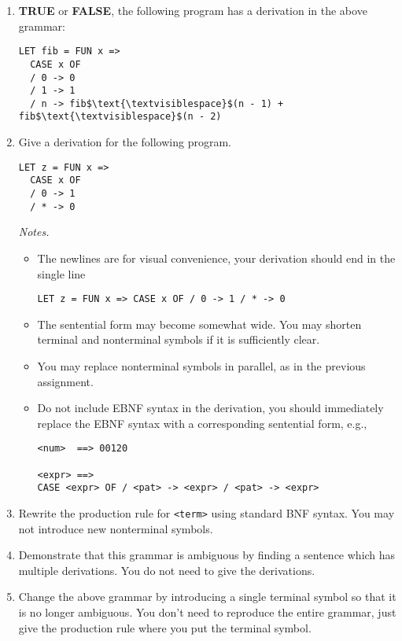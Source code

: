 \documentclass{article}
\theoremstyle{remark} \newtheorem*{solution}{Solution}
\begin{document}
\begin{enumerate}
\item
\textbf{TRUE} or \textbf{FALSE}, the following program has a
derivation in the above grammar:
\begin{lstlisting}[mathescape=true]
LET fib = FUN x =>
  CASE x OF
  / 0 -> 0
  / 1 -> 1
  / n -> fib$\text{\textvisiblespace}$(n - 1) + fib$\text{\textvisiblespace}$(n - 2)
\end{lstlisting}
\pagebreak
\item Give a derivation for the following program.
\begin{lstlisting}
LET z = FUN x =>
  CASE x OF
  / 0 -> 1
  / * -> 0
\end{lstlisting}
\textit{Notes.}
\begin{itemize}
\item
The newlines are for visual convenience, your derivation should end in
the single line
\begin{lstlisting}
LET z = FUN x => CASE x OF / 0 -> 1 / * -> 0
\end{lstlisting}
\item
The sentential form may become somewhat wide. You may shorten terminal
and nonterminal symbols if it is sufficiently clear.
\item
You may replace nonterminal symbols in parallel, as in the previous
assignment.
\item
Do not include EBNF syntax in the derivation, you should immediately
replace the EBNF syntax with a corresponding sentential form, e.g.,
\begin{lstlisting}
<num>  ==> 00120

<expr> ==>
CASE <expr> OF / <pat> -> <expr> / <pat> -> <expr>
\end{lstlisting}
\end{itemize}
\pagebreak
\item
Rewrite the production rule for \texttt{<term>} using standard BNF
syntax.  You may not introduce new nonterminal symbols.
\item
Demonstrate that this grammar is ambiguous by finding a sentence which
has multiple derivations.  You do not need to give the derivations.
\item
Change the above grammar by introducing a single terminal symbol so
that it is no longer ambiguous.  You don't need to reproduce the
entire grammar, just give the production rule where you put the
terminal symbol.
\end{enumerate}


\pagebreak
\end{document}
